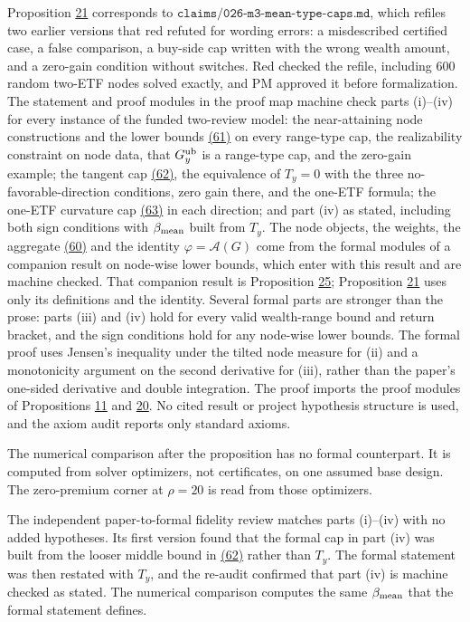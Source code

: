 \documentclass[11pt]{article}
\begin{document}
Proposition \hyperref[res:Proposition-21]{21} corresponds to
\(\texttt{claims/026-m3-mean-type-caps.md}\), which refiles two
earlier versions that red refuted for wording errors: a misdescribed
certified case, a false comparison, a buy-side cap written with the
wrong wealth amount, and a zero-gain condition without switches. Red
checked the refile, including 600 random two-ETF nodes solved
exactly, and PM approved it before formalization. The statement
and proof modules in the proof map machine check parts (i)--(iv)
for every instance of the funded two-review model: the
near-attaining node constructions and the lower bounds \hyperref[eq:61]{(61)} on
every range-type cap, the realizability constraint on node data,
that \(G^{\rm ub}_y\) is a range-type cap, and the zero-gain
example; the tangent cap \hyperref[eq:62]{(62)}, the equivalence of \(T_y=0\)
with the three no-favorable-direction conditions, zero gain there,
and the one-ETF formula; the one-ETF curvature cap \hyperref[eq:63]{(63)} in each
direction; and part (iv) as stated, including both sign
conditions with \(\beta_{\rm mean}\) built from \(T_y\). The node
objects, the weights, the aggregate \hyperref[eq:60]{(60)} and the identity
\(\varphi=\mathcal A(G)\) come from the formal modules of a
companion result on node-wise lower bounds, which enter with this
result and are machine checked. That companion result is
Proposition \hyperref[res:Proposition-25]{25}; Proposition \hyperref[res:Proposition-21]{21} uses only its definitions and the
identity. Several formal parts are stronger than the prose: parts
(iii) and (iv) hold for every valid wealth-range bound and return
bracket, and the sign conditions hold for any node-wise lower
bounds. The formal proof uses Jensen's inequality under the
tilted node measure for (ii) and a monotonicity argument on the
second derivative for (iii), rather than the paper's one-sided
derivative and double integration. The proof imports the proof
modules of Propositions \hyperref[res:Proposition-11]{11} and \hyperref[res:Proposition-20]{20}. No cited result or project
hypothesis structure is used, and the axiom audit reports only
standard axioms.

The numerical comparison after the proposition has no formal
counterpart. It is computed from solver optimizers, not
certificates, on one assumed base design. The zero-premium corner
at \(\rho=20\) is read from those optimizers.

The independent paper-to-formal fidelity review matches parts
(i)--(iv) with no added hypotheses. Its first version found that
the formal cap in part (iv) was built from the looser middle bound
in \hyperref[eq:62]{(62)} rather than \(T_y\). The formal statement was then
restated with \(T_y\), and the re-audit confirmed that part (iv)
is machine checked as stated. The numerical comparison computes
the same \(\beta_{\rm mean}\) that the formal statement defines.
\end{document}
